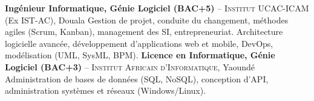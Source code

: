 %
%
%


\begin{scholarship}
					{\textbf{Ingénieur Informatique, Génie Logiciel (BAC+5)} -- \textsc{Institut UCAC-ICAM} (Ex IST-AC), Douala\newline
					\footnotesize{Gestion de projet, conduite du changement, méthodes agiles (Scrum, Kanban), management des SI, entrepreneuriat. Architecture logicielle avancée, développement d'applications web et mobile, DevOps, modélisation (UML, SysML, BPM).}}
					{\textbf{Licence en Informatique, Génie Logiciel (BAC+3)} -- \textsc{Institut Africain d'Informatique}, Yaoundé\newline
					\footnotesize{Administration de bases de données (SQL, NoSQL), conception d'API, administration systèmes et réseaux (Windows/Linux).}}
\end{scholarship}


\begin{scholarship}
\end{scholarship}
